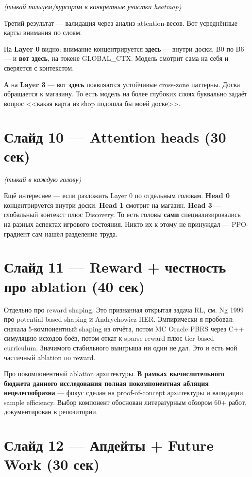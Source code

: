 \documentclass[a4paper,12pt]{extarticle}
\begin{document}
\textit{(тыкай пальцем/курсором в конкретные участки heatmap)}

Третий результат --- валидация через анализ attention-весов. Вот усреднённые карты внимания по слоям.

На \textbf{Layer 0} видно: внимание концентрируется \textbf{здесь} --- внутри доски, B0 по B6 --- и \textbf{вот здесь}, на токене GLOBAL\_CTX. Модель смотрит сама на себя и сверяется с контекстом.

А на \textbf{Layer 3} --- вот \textbf{здесь} появляются устойчивые cross-zone паттерны. Доска обращается к магазину. То есть модель на более глубоких слоях буквально задаёт вопрос <<какая карта из shop подошла бы моей доске>>.

\section*{Слайд 10 --- Attention heads (30 сек)}

\textit{(тыкай в каждую голову)}

Ещё интереснее --- если разложить Layer 0 по отдельным головам. \textbf{Head 0} концентрируется внутри доски. \textbf{Head 1} смотрит на магазин. \textbf{Head 3} --- глобальный контекст плюс Discovery. То есть головы \textbf{сами} специализировались на разных аспектах игрового состояния. Никто их к этому не принуждал --- PPO-градиент сам нашёл разделение труда.

\section*{Слайд 11 --- Reward + честность про ablation (40 сек)}

Отдельно про reward shaping. Это признанная открытая задача RL, см. Ng 1999 про potential-based shaping и Andrychowicz HER. Эмпирически я пробовал: сначала 5-компонентный shaping из отчёта, потом MC Oracle PBRS через C++ симуляцию исходов боёв, потом откат к sparse reward плюс tier-based curriculum. Значимого стабильного выигрыша ни один не дал. Это и есть мой частичный ablation по reward.

Про покомпонентный ablation архитектуры. \textbf{В рамках вычислительного бюджета данного исследования полная покомпонентная абляция нецелесообразна} --- фокус сделан на proof-of-concept архитектуры и валидации sample efficiency. Выбор компонент обоснован литературным обзором 60+ работ, документирован в репозитории.

\section*{Слайд 12 --- Апдейты + Future Work (30 сек)}
\end{document}
